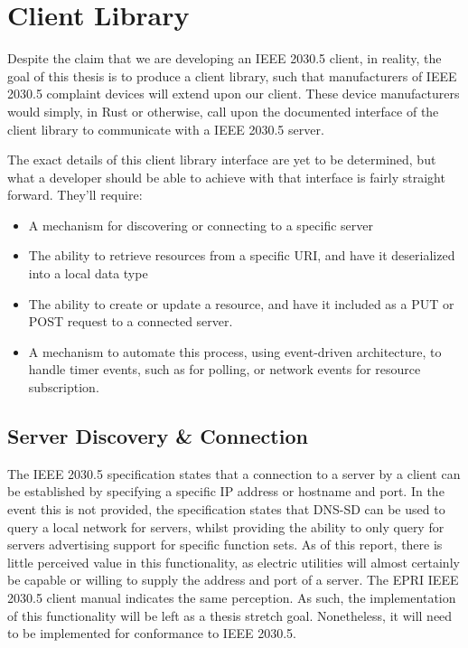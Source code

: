 \section{Client Library}
Despite the claim that we are developing an IEEE 2030.5 client, in reality, the goal of this thesis is to produce a client library, such that manufacturers of IEEE 2030.5 complaint devices will extend upon our client.
These device manufacturers would simply, in Rust or otherwise, call upon the documented interface of the client library to communicate with a IEEE 2030.5 server.

The exact details of this client library interface are yet to be determined, but what a developer should be able to achieve with that interface is fairly straight forward. They'll require:

\begin{itemize}
    \item A mechanism for discovering or connecting to a specific server
    \item The ability to retrieve resources from a specific URI, and have it deserialized into a local data type
    \item The ability to create or update a resource, and have it included as a PUT or POST request to a connected server.
    \item A mechanism to automate this process, using event-driven architecture, to handle timer events, such as for polling, or network events for resource subscription.
\end{itemize}

\subsection{Server Discovery \& Connection}
The IEEE 2030.5 specification states that a connection to a server by a client can be established by specifying a specific IP address or hostname and port.
In the event this is not provided, the specification states that DNS-SD can be used to query a local network for servers, whilst providing the ability to only query for servers advertising support for specific function sets.
As of this report, there is little perceived value in this functionality, as electric utilities will almost certainly be capable or willing to supply the address and port of a server.
The EPRI IEEE 2030.5 client manual indicates the same perception.\cite[]{eprimanual}
As such, the implementation of this functionality will be left as a thesis stretch goal. Nonetheless, it will need to be implemented for conformance to IEEE 2030.5.

